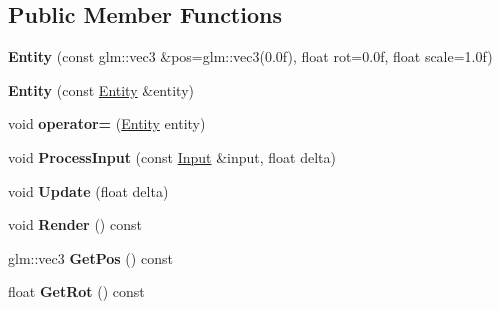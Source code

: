 \subsection*{Public Member Functions}
\begin{DoxyCompactItemize}
\item 
\hypertarget{class_z_e_g_l_1_1_entity_a8011b8bee6e9c4893feb9a769db2a1d7}{}{\bfseries Entity} (const glm\+::vec3 \&pos=glm\+::vec3(0.\+0f), float rot=0.\+0f, float scale=1.\+0f)\label{class_z_e_g_l_1_1_entity_a8011b8bee6e9c4893feb9a769db2a1d7}

\item 
\hypertarget{class_z_e_g_l_1_1_entity_ab7136fc011809bc9bcc43862fd4c38ae}{}{\bfseries Entity} (const \hyperlink{class_z_e_g_l_1_1_entity}{Entity} \&entity)\label{class_z_e_g_l_1_1_entity_ab7136fc011809bc9bcc43862fd4c38ae}

\item 
\hypertarget{class_z_e_g_l_1_1_entity_ad5567bfde28b80800e34e17e8265cd26}{}void {\bfseries operator=} (\hyperlink{class_z_e_g_l_1_1_entity}{Entity} entity)\label{class_z_e_g_l_1_1_entity_ad5567bfde28b80800e34e17e8265cd26}

\item 
\hypertarget{class_z_e_g_l_1_1_entity_a39ceb0819b666f4605f3a6f78d4c7547}{}void {\bfseries Process\+Input} (const \hyperlink{class_z_e_g_l_1_1_input}{Input} \&input, float delta)\label{class_z_e_g_l_1_1_entity_a39ceb0819b666f4605f3a6f78d4c7547}

\item 
\hypertarget{class_z_e_g_l_1_1_entity_aa108f7618082d370fd414473a56ee61c}{}void {\bfseries Update} (float delta)\label{class_z_e_g_l_1_1_entity_aa108f7618082d370fd414473a56ee61c}

\item 
\hypertarget{class_z_e_g_l_1_1_entity_a026a323eaa1744bfaf4ff874d47abc2f}{}void {\bfseries Render} () const \label{class_z_e_g_l_1_1_entity_a026a323eaa1744bfaf4ff874d47abc2f}

\item 
\hypertarget{class_z_e_g_l_1_1_entity_a094aff78afc94ae73ca0bbc7f884e9b4}{}glm\+::vec3 {\bfseries Get\+Pos} () const \label{class_z_e_g_l_1_1_entity_a094aff78afc94ae73ca0bbc7f884e9b4}

\item 
\hypertarget{class_z_e_g_l_1_1_entity_acce32e7c26286c7309d05c4c6cc4a8e2}{}float {\bfseries Get\+Rot} () const \label{class_z_e_g_l_1_1_entity_acce32e7c26286c7309d05c4c6cc4a8e2}


\end{DoxyCompactItemize}
